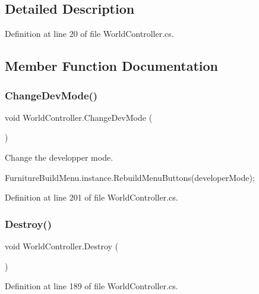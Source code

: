 \subsection{Detailed Description}


Definition at line 20 of file World\+Controller.\+cs.



\subsection{Member Function Documentation}
\mbox{\label{class_world_controller_af59950c2a931c2201d6f3cec898b90c5}} 
\subsubsection{\texorpdfstring{Change\+Dev\+Mode()}{ChangeDevMode()}}
{\footnotesize\ttfamily void World\+Controller.\+Change\+Dev\+Mode (\begin{DoxyParamCaption}{ }\end{DoxyParamCaption})}



Change the developper mode. 

Furniture\+Build\+Menu.\+instance.\+Rebuild\+Menu\+Buttons(developer\+Mode); 

Definition at line 201 of file World\+Controller.\+cs.

\mbox{\label{class_world_controller_aada59737c9d351025ec763d0a7a870a8}} 
\subsubsection{\texorpdfstring{Destroy()}{Destroy()}}
{\footnotesize\ttfamily void World\+Controller.\+Destroy (\begin{DoxyParamCaption}{ }\end{DoxyParamCaption})}



Definition at line 189 of file World\+Controller.\+cs.

\mbox{\label{class_world_controller_ad2ac06d87936d4b4cdaab4bef1107feb}} 
